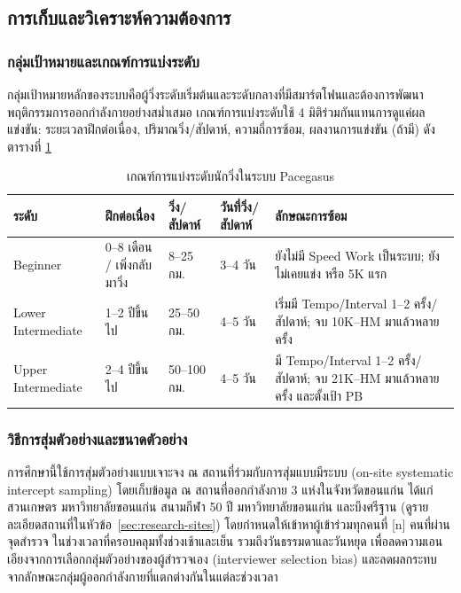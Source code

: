 \subsection{การเก็บและวิเคราะห์ความต้องการ}

\subsubsection{กลุ่มเป้าหมายและเกณฑ์การแบ่งระดับ}

กลุ่มเป้าหมายหลักของระบบคือผู้วิ่งระดับเริ่มต้นและระดับกลางที่มีสมาร์ตโฟนและต้องการพัฒนาพฤติกรรมการออกกำลังกายอย่างสม่ำเสมอ เกณฑ์การแบ่งระดับใช้ 4 มิติร่วมกันแทนการดูแค่ผลแข่งขัน: ระยะเวลาฝึกต่อเนื่อง, ปริมาณวิ่ง/สัปดาห์, ความถี่การซ้อม, ผลงานการแข่งขัน (ถ้ามี) ดังตารางที่ \ref{tab:runner-level}

\begin{table}[H]
\centering
\caption{เกณฑ์การแบ่งระดับนักวิ่งในระบบ Pacegasus}
\label{tab:runner-level}
\small
\begin{tabular}{|p{1.65cm}|p{1.85cm}|p{1.45cm}|p{1.35cm}|p{3.1cm}|}
\hline
\textbf{ระดับ} & \textbf{ฝึกต่อเนื่อง} & \textbf{วิ่ง/สัปดาห์} & \textbf{วันที่วิ่ง/สัปดาห์} & \textbf{ลักษณะการซ้อม} \\ \hline
Beginner & 0--8 เดือน / เพิ่งกลับมาวิ่ง & 8--25 กม. & 3--4 วัน & ยังไม่มี Speed Work เป็นระบบ; ยังไม่เคยแข่ง หรือ 5K แรก \\ \hline
Lower Intermediate & 1--2 ปีขึ้นไป & 25--50 กม. & 4--5 วัน & เริ่มมี Tempo/Interval 1--2 ครั้ง/สัปดาห์; จบ 10K--HM มาแล้วหลายครั้ง \\ \hline
Upper Intermediate & 2--4 ปีขึ้นไป & 50--100 กม. & 4--5 วัน & มี Tempo/Interval 1--2 ครั้ง/สัปดาห์; จบ 21K--HM มาแล้วหลายครั้ง และตั้งเป้า PB \\ \hline

\end{tabular}
\end{table}

\subsubsection{วิธีการสุ่มตัวอย่างและขนาดตัวอย่าง}

การศึกษานี้ใช้การสุ่มตัวอย่างแบบเจาะจง ณ สถานที่ร่วมกับการสุ่มแบบมีระบบ (on-site systematic intercept sampling) โดยเก็บข้อมูล ณ สถานที่ออกกำลังกาย 3 แห่งในจังหวัดขอนแก่น ได้แก่ สวนเกษตร มหาวิทยาลัยขอนแก่น สนามกีฬา 50 ปี มหาวิทยาลัยขอนแก่น และบึงศรีฐาน (ดูรายละเอียดสถานที่ในหัวข้อ~\ref{sec:research-sites})
โดยกำหนดให้เข้าหาผู้เข้าร่วมทุกคนที่ [n] คนที่ผ่านจุดสำรวจ ในช่วงเวลาที่ครอบคลุมทั้งช่วงเช้าและเย็น รวมถึงวันธรรมดาและวันหยุด เพื่อลดความเอนเอียงจากการเลือกกลุ่มตัวอย่างของผู้สำรวจเอง (interviewer selection bias) และลดผลกระทบจากลักษณะกลุ่มผู้ออกกำลังกายที่แตกต่างกันในแต่ละช่วงเวลา

